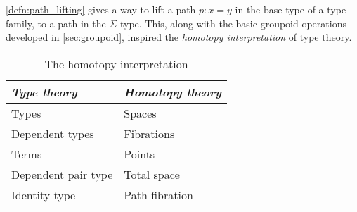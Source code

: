 \autoref{defn:path_lifting} gives a way to lift a path $p:x=y$ in the base type of a type family, to a path in the $\Sigma$-type. This, along with the basic groupoid operations developed in \autoref{sec:groupoid}, inspired the \emph{homotopy interpretation} of type theory.

\begin{table}
\begin{center}
\caption{The homotopy interpretation}
\begin{tabular}{ll}
\toprule
\emph{Type theory} &  \emph{Homotopy theory} \\
\midrule
Types  & Spaces \\
Dependent types & Fibrations \\
Terms & Points \\
Dependent pair type & Total space \\
Identity type & Path fibration\\
\bottomrule
\end{tabular}
\end{center}
\end{table}

